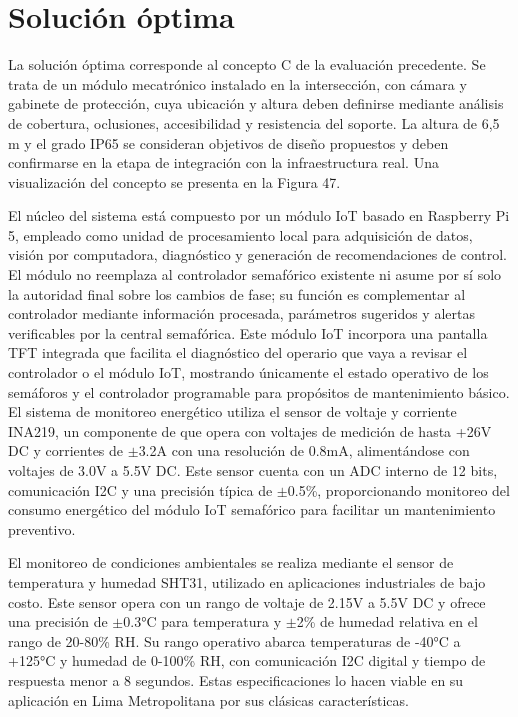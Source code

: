 \documentclass[12pt,a4paper,oneside]{report}
\begin{document}
\section{Solución óptima}\label{soluciuxf3n-uxf3ptima}

La solución óptima corresponde al concepto C de la evaluación precedente. Se trata de un módulo mecatrónico instalado en la intersección, con cámara y gabinete de protección, cuya ubicación y altura deben definirse mediante análisis de cobertura, oclusiones, accesibilidad y resistencia del soporte. La altura de 6,5 m y el grado IP65 se consideran objetivos de diseño propuestos y deben confirmarse en la etapa de integración con la infraestructura real. Una visualización del concepto se presenta en la Figura 47.

El núcleo del sistema está compuesto por un módulo IoT basado en Raspberry Pi 5, empleado como unidad de procesamiento local para adquisición de datos, visión por computadora, diagnóstico y generación de recomendaciones de control. El módulo no reemplaza al controlador semafórico existente ni asume por sí solo la autoridad final sobre los cambios de fase; su función es complementar al controlador mediante información procesada, parámetros sugeridos y alertas verificables por la central semafórica. Este módulo IoT incorpora una pantalla TFT integrada que facilita el diagnóstico del operario que vaya a revisar el controlador o el módulo IoT, mostrando únicamente el estado operativo de los semáforos y el controlador programable para propósitos de mantenimiento básico. El sistema de monitoreo energético utiliza el sensor de voltaje y corriente INA219, un componente de que opera con voltajes de medición de hasta +26V DC y corrientes de \ensuremath{\pm}3.2A con una resolución de 0.8mA, alimentándose con voltajes de 3.0V a 5.5V DC. Este sensor cuenta con un ADC interno de 12 bits, comunicación I2C y una precisión típica de \ensuremath{\pm}0.5\%, proporcionando monitoreo del consumo energético del módulo IoT semafórico para facilitar un mantenimiento preventivo.

El monitoreo de condiciones ambientales se realiza mediante el sensor de temperatura y humedad SHT31, utilizado en aplicaciones industriales de bajo costo. Este sensor opera con un rango de voltaje de 2.15V a 5.5V DC y ofrece una precisión de \ensuremath{\pm}0.3°C para temperatura y \ensuremath{\pm}2\% de humedad relativa en el rango de 20-80\% RH. Su rango operativo abarca temperaturas de -40°C a +125°C y humedad de 0-100\% RH, con comunicación I2C digital y tiempo de respuesta menor a 8 segundos. Estas especificaciones lo hacen viable en su aplicación en Lima Metropolitana por sus clásicas características.
\end{document}
